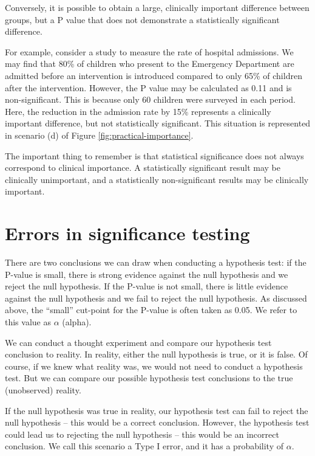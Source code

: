 \documentclass[
]{memoir}
\begin{document}
Conversely, it is possible to obtain a large, clinically important difference between groups, but a P value that does not demonstrate a statistically significant difference.

For example, consider a study to measure the rate of hospital admissions. We may find that 80\% of children who present to the Emergency Department are admitted before an intervention is introduced compared to only 65\% of children after the intervention. However, the P value may be calculated as 0.11 and is non-significant. This is because only 60 children were surveyed in each period. Here, the reduction in the admission rate by 15\% represents a clinically important difference, but not statistically significant. This situation is represented in scenario (d) of Figure \ref{fig:practical-importance}.

The important thing to remember is that statistical significance does not always correspond to clinical importance. A statistically significant result may be clinically unimportant, and a statistically non-significant results may be clinically important.

\hypertarget{errors-in-significance-testing}{%
\section{Errors in significance testing}\label{errors-in-significance-testing}}

There are two conclusions we can draw when conducting a hypothesis test: if the P-value is small, there is strong evidence against the null hypothesis and we reject the null hypothesis. If the P-value is not small, there is little evidence against the null hypothesis and we fail to reject the null hypothesis. As discussed above, the ``small'' cut-point for the P-value is often taken as 0.05. We refer to this value as \(\alpha\) (alpha).

We can conduct a thought experiment and compare our hypothesis test conclusion to reality. In reality, either the null hypothesis is true, or it is false. Of course, if we knew what reality was, we would not need to conduct a hypothesis test. But we can compare our possible hypothesis test conclusions to the true (unobserved) reality.

If the null hypothesis was true in reality, our hypothesis test can fail to reject the null hypothesis -- this would be a correct conclusion. However, the hypothesis test could lead us to rejecting the null hypothesis -- this would be an incorrect conclusion. We call this scenario a Type I error, and it has a probability of \(\alpha\).
\end{document}
